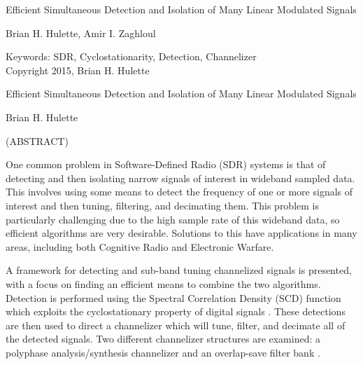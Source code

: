 \documentclass[12pt]{report}
\begin{document}
\newcommand{\fourier}{\mathcal{F}}

\thispagestyle{empty}
\begin{center}

{\large Efficient Simultaneous Detection and Isolation of
Many Linear Modulated Signals}

\vfill

Brian H. Hulette, Amir I. Zaghloul

\vfill

Keywords: SDR, Cyclostationarity, Detection, Channelizer
\\
Copyright 2015, Brian H. Hulette

\end{center}

\pagebreak

\thispagestyle{empty}
\begin{center}

{\large Efficient Simultaneous Detection and Isolation of
Many Linear Modulated Signals}

\vfill

Brian H. Hulette

\vfill

(ABSTRACT)

\vfill

\end{center}

One common problem in Software-Defined Radio (SDR) systems is that of
detecting and then isolating narrow signals of interest in wideband sampled
data. This involves using some means to detect the frequency of one or more
signals of interest and then tuning, filtering, and decimating them. This
problem is particularly challenging due to the high sample rate of this
wideband data, so efficient algorithms are very desirable. Solutions to this
have applications in many areas, including both Cognitive Radio and
Electronic Warfare.

A framework for detecting and sub-band tuning channelized signals is presented,
with a focus on finding an efficient means to combine the two algorithms.
Detection is performed using the Spectral Correlation Density (SCD) function
which exploits the cyclostationary property of digital signals \cite{Gardner1}.
These detections are then used to direct a channelizer which will tune, filter,
and decimate all of the detected signals. Two different channelizer structures
are examined: a polyphase analysis/synthesis channelizer \cite{Harris1} and an
overlap-save filter bank \cite{Borgerding1}.
\end{document}
